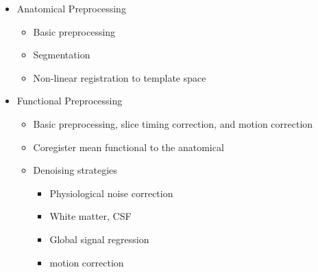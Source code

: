 \begin{itemize}
    \item Anatomical Preprocessing
    \begin{itemize}
        \item Basic preprocessing
        \item Segmentation
        \item Non-linear registration to template space
    \end{itemize}
    \item Functional Preprocessing
    \begin{itemize}
        \item Basic preprocessing, slice timing correction, and motion correction
        \item Coregister mean functional to the anatomical
        \item Denoising strategies
        \begin{itemize}
            \item Physiological noise correction
            \item White matter, CSF
            \item Global signal regression
            \item motion correction
        \end{itemize}
    \end{itemize}
\end{itemize}

